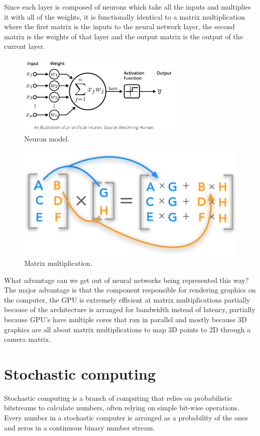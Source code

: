 \documentclass[a4paper,oneside,phd,etd]{BYUPhys}
\begin{document}
Since each layer is composed of neurons which take all the inputs and multiplies it with all of the weights, it is functionally identical to a matrix multiplication where the first matrix is the inputs to the neural network layer, the second matrix is the weights of that layer and the output matrix is the output of the current layer.
\begin{figure}[H]
\centering
\includegraphics[width=8cm]{pictures/neuron_model.png}
\caption{Neuron model\cite{fig:neuron_model}.}
\label{fig:neuron_model}
\end{figure}
\begin{figure}[H]
\centering
\includegraphics[scale=0.5]{pictures/matrix-multiply.png}
\caption{Matrix multiplication\cite{fig:matrix-multiply}.}
\label{fig:neuron_model}
\end{figure}
What advantage can we get out of neural networks being represented this way? The major advantage is that the component responsible for rendering graphics on the computer, the GPU is extremely efficient at matrix multiplications partially because of the architecture is arranged for bandwidth instead of latency, partially because GPU's have multiple cores that run in parallel and mostly because 3D graphics are all about matrix multiplications to map 3D points to 2D through a camera matrix.

\section{Stochastic computing}
Stochastic computing is a branch of computing that relies on probabilistic bitstreams to calculate numbers, often relying on simple bit-wise operations. Every number in a stochastic computer is arranged as a probability of the ones and zeros in a continuous binary number stream\cite{6800290}. 
\end{document}
